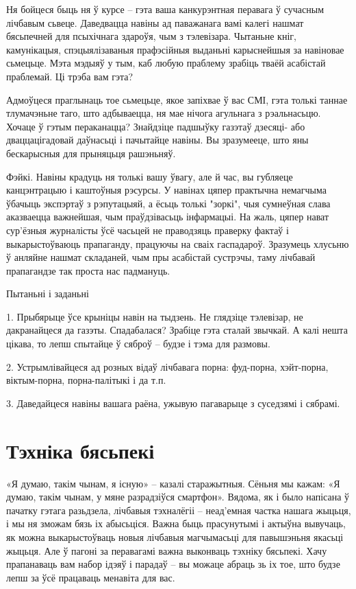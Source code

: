 Ня бойцеся быць ня ў курсе – гэта ваша канкурэнтная перавага ў сучасным лічбавым сьвеце. Даведвацца навіны ад паважанага вамі калегі нашмат бясьпечней для псыхічнага здароўя, чым з тэлевізара. Чытаньне кніг, камунікацыя, спэцыялізаваныя прафэсійныя выданьні карыснейшыя за навіновае сьмецьце. Мэта мэдыяў у тым, каб любую праблему зрабіць тваёй асабістай праблемай. Ці трэба вам гэта?

Адмоўцеся праглынаць тое сьмецьце, якое запіхвае ў вас СМІ, гэта толькі таннае тлумачэньне таго, што адбываецца, ня мае нічога агульнага з рэальнасьцю. Хочаце ў гэтым пераканацца? Знайдзіце падшыўку газэтаў дзесяці- або дваццацігадовай даўнасьці і пачытайце навіны. Вы зразумееце, што яны бескарысныя для прыняцьця рашэньняў.

Фэйкі. Навіны крадуць ня толькі вашу ўвагу, але й час, вы губляеце канцэнтрацыю і каштоўныя рэсурсы. У навінах цяпер практычна немагчыма ўбачыць экспэртаў з рэпутацыяй, а ёсьць толькі "зоркі", чыя сумнеўная слава аказваецца важнейшая, чым праўдзівасьць інфармацыі. На жаль, цяпер нават сур'ёзныя журналісты ўсё часьцей не праводзяць праверку фактаў і выкарыстоўваюць прапаганду, працуючы на сваіх гаспадароў. Зразумець хлусьню ў анляйне нашмат складаней, чым пры асабістай сустрэчы, таму лічбавай прапагандзе так проста нас падмануць.

Пытаньні і заданьні

1. Прыбярыце ўсе крыніцы навін на тыдзень. Не глядзіце тэлевізар, не дакранайцеся да газэты. Спадабалася? Зрабіце гэта сталай звычкай. А калі нешта цікава, то лепш спытайце ў сяброў – будзе і тэма для размовы.

2. Устрымлівайцеся ад розных відаў лічбавага порна: фуд-порна, хэйт-порна, віктым-порна, порна-палітыкі і да т.п.

3. Даведайцеся навіны вашага раёна, ужывую пагаварыце з суседзямі і сябрамі.


\section{Тэхніка бясьпекі}

«Я думаю, такім чынам, я існую» – казалі старажытныя. Сёньня мы кажам: «Я думаю, такім чынам, у мяне разрадзіўся смартфон». Вядома, як і было напісана ў пачатку гэтага разьдзела, лічбавыя тэхналёгіі – неад'емная частка нашага жыцьця, і мы ня зможам бязь іх абысьціся. Важна быць прасунутымі і актыўна вывучаць, як можна выкарыстоўваць новыя лічбавыя магчымасьці для павышэньня якасьці жыцьця. Але ў пагоні за перавагамі важна выконваць тэхніку бясьпекі. Хачу прапанаваць вам набор ідэяў і парадаў – вы можаце абраць зь іх тое, што будзе лепш за ўсё працаваць менавіта для вас.

